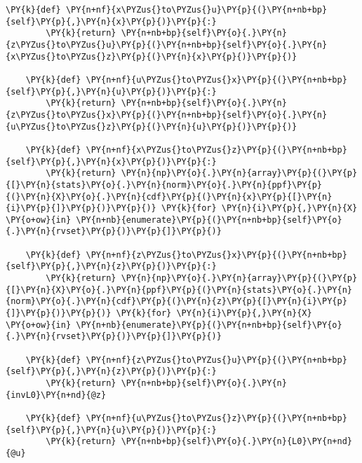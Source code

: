 \begin{tcolorbox}[breakable, size=fbox, boxrule=1pt, pad at break*=1mm,colback=cellbackground, colframe=cellborder]
\begin{Verbatim}[commandchars=\\\{\}]
    \PY{k}{def} \PY{n+nf}{x\PYZus{}to\PYZus{}u}\PY{p}{(}\PY{n+nb+bp}{self}\PY{p}{,}\PY{n}{x}\PY{p}{)}\PY{p}{:}
        \PY{k}{return} \PY{n+nb+bp}{self}\PY{o}{.}\PY{n}{z\PYZus{}to\PYZus{}u}\PY{p}{(}\PY{n+nb+bp}{self}\PY{o}{.}\PY{n}{x\PYZus{}to\PYZus{}z}\PY{p}{(}\PY{n}{x}\PY{p}{)}\PY{p}{)}

    \PY{k}{def} \PY{n+nf}{u\PYZus{}to\PYZus{}x}\PY{p}{(}\PY{n+nb+bp}{self}\PY{p}{,}\PY{n}{u}\PY{p}{)}\PY{p}{:}
        \PY{k}{return} \PY{n+nb+bp}{self}\PY{o}{.}\PY{n}{z\PYZus{}to\PYZus{}x}\PY{p}{(}\PY{n+nb+bp}{self}\PY{o}{.}\PY{n}{u\PYZus{}to\PYZus{}z}\PY{p}{(}\PY{n}{u}\PY{p}{)}\PY{p}{)}

    \PY{k}{def} \PY{n+nf}{x\PYZus{}to\PYZus{}z}\PY{p}{(}\PY{n+nb+bp}{self}\PY{p}{,}\PY{n}{x}\PY{p}{)}\PY{p}{:}
        \PY{k}{return} \PY{n}{np}\PY{o}{.}\PY{n}{array}\PY{p}{(}\PY{p}{[}\PY{n}{stats}\PY{o}{.}\PY{n}{norm}\PY{o}{.}\PY{n}{ppf}\PY{p}{(}\PY{n}{X}\PY{o}{.}\PY{n}{cdf}\PY{p}{(}\PY{n}{x}\PY{p}{[}\PY{n}{i}\PY{p}{]}\PY{p}{)}\PY{p}{)} \PY{k}{for} \PY{n}{i}\PY{p}{,}\PY{n}{X} \PY{o+ow}{in} \PY{n+nb}{enumerate}\PY{p}{(}\PY{n+nb+bp}{self}\PY{o}{.}\PY{n}{rvset}\PY{p}{)}\PY{p}{]}\PY{p}{)}
    
    \PY{k}{def} \PY{n+nf}{z\PYZus{}to\PYZus{}x}\PY{p}{(}\PY{n+nb+bp}{self}\PY{p}{,}\PY{n}{z}\PY{p}{)}\PY{p}{:}
        \PY{k}{return} \PY{n}{np}\PY{o}{.}\PY{n}{array}\PY{p}{(}\PY{p}{[}\PY{n}{X}\PY{o}{.}\PY{n}{ppf}\PY{p}{(}\PY{n}{stats}\PY{o}{.}\PY{n}{norm}\PY{o}{.}\PY{n}{cdf}\PY{p}{(}\PY{n}{z}\PY{p}{[}\PY{n}{i}\PY{p}{]}\PY{p}{)}\PY{p}{)} \PY{k}{for} \PY{n}{i}\PY{p}{,}\PY{n}{X} \PY{o+ow}{in} \PY{n+nb}{enumerate}\PY{p}{(}\PY{n+nb+bp}{self}\PY{o}{.}\PY{n}{rvset}\PY{p}{)}\PY{p}{]}\PY{p}{)}
    
    \PY{k}{def} \PY{n+nf}{z\PYZus{}to\PYZus{}u}\PY{p}{(}\PY{n+nb+bp}{self}\PY{p}{,}\PY{n}{z}\PY{p}{)}\PY{p}{:}
        \PY{k}{return} \PY{n+nb+bp}{self}\PY{o}{.}\PY{n}{invL0}\PY{n+nd}{@z}

    \PY{k}{def} \PY{n+nf}{u\PYZus{}to\PYZus{}z}\PY{p}{(}\PY{n+nb+bp}{self}\PY{p}{,}\PY{n}{u}\PY{p}{)}\PY{p}{:}
        \PY{k}{return} \PY{n+nb+bp}{self}\PY{o}{.}\PY{n}{L0}\PY{n+nd}{@u}


\end{Verbatim}
\end{tcolorbox}
